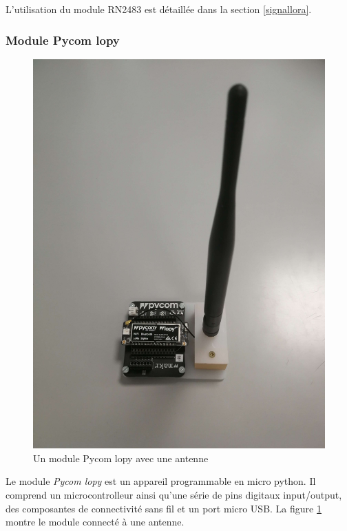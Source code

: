 \vspace{0.1cm}

L'utilisation du module RN2483 est détaillée dans la section \ref{signallora}.

\subsubsection{Module Pycom lopy}

\begin{figure}[h]
\centering

\includegraphics[scale=0.08]{images/lopy.png}
\caption{Un module Pycom lopy avec une antenne}\label{term35}
\end{figure}

Le module \textit{Pycom lopy} est un appareil programmable en micro python. Il comprend un microcontrolleur ainsi qu'une série de pins digitaux input/output,  des composantes de connectivité sans fil et un port micro USB. La figure \ref{term35} montre le module  connecté à une antenne.

